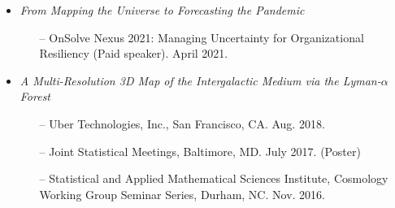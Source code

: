 \documentclass[letterpaper,10pt]{article}
\begin{document}
\begin{itemize}[itemsep=0.3cm, leftmargin=0.6cm]
\item {\it From Mapping the Universe to Forecasting the Pandemic}
\begin{itemize}[leftmargin=0.55cm, itemsep=0.1cm]
\item[--] OnSolve Nexus 2021: {Managing Uncertainty for Organizational Resiliency} (Paid speaker). April 2021.
\end{itemize}

\item {\it A Multi-Resolution 3D Map of the Intergalactic Medium via the Lyman-$\alpha$ Forest}
\begin{itemize}[leftmargin=0.55cm, itemsep=0.1cm]
\item[--] Uber Technologies, Inc., San Francisco, CA. Aug. 2018.
\item[--] Joint Statistical Meetings, Baltimore, MD. July 2017. (Poster)
\item[--] Statistical and Applied Mathematical Sciences Institute, Cosmology Working Group Seminar Series, Durham, NC. Nov. 2016.
\end{itemize}

\end{itemize}


\vspace{0.01cm}
\end{document}
